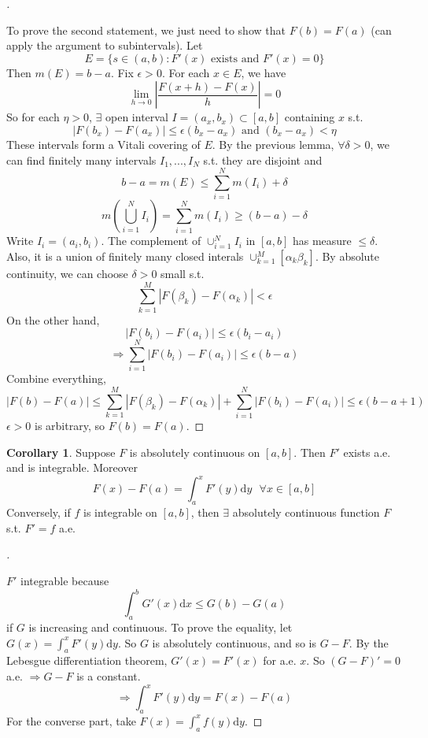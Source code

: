 \documentclass{article}
\theoremstyle{definition}
\newtheorem{cor}{Corollary}
\newenvironment{proofs}[1][\proofname]{%
  \begin{proof}[#1]$ $\par\nobreak\ignorespaces
}{%
  \end{proof}
}
\newcommand{\sfa}{\text{  } \forall}
\begin{document}
\begin{proofs}
  To prove the second statement, we just need to show that $F(b) = F(a)$ (can apply the argument to subintervals). Let 
  \[
    E = \{ s \in (a, b): F'(x) \text{ exists and } F'(x) = 0\}
  \]
  Then $m(E) = b - a$. Fix $\epsilon > 0$. For each $x \in E$, we have 
  \[
    \lim_{h \to 0} \left|\frac{F(x + h) - F(x)}{h}\right| = 0
  \]
  So for each $\eta > 0$, $\exists $ open interval $I = (a_x, b_x) \subset [a, b]$ containing $x$ s.t.
  \[
    |F(b_x) - F(a_x)| \leq \epsilon (b_x - a_x) \text{ and } (b_x - a_x) < \eta
  \]
  These intervals form a Vitali covering of $E$. By the previous lemma, $\forall \delta >0 $, we can find finitely many intervals $I_1, ..., I_N$ s.t. they are disjoint and 
  \[
    b - a = m(E) \leq \sum_{i = 1}^N m(I_i) + \delta
  \]
  \[
    m \left( \bigcup_{i = 1}^N I_i \right) = \sum_{i = 1}^N m(I_i) \geq (b - a) - \delta 
  \]
  Write $I_i = (a_i, b_i)$. The complement of $\cup_{i = 1}^N I_i$ in $[a, b]$ has measure $\leq \delta$. Also, it is a union of finitely many closed interals $\cup_{k = 1}^M [\alpha_k \beta_k]$. By absolute continuity, we can choose $\delta > 0$ small s.t.
  \[
    \sum_{k = 1}^M |F(\beta_k) - F(\alpha_k)| < \epsilon
  \]
  On the other hand, 
  \[
    |F(b_i) - F(a_i)| \leq \epsilon (b_i - a_i)
  \]
  \[
    \Rightarrow \sum_{i = 1}^N |F(b_i) - F(a_i)| \leq \epsilon (b - a)
  \]
  Combine everything, 
  \[
    |F(b) - F(a)| \leq \sum_{k = 1}^M |F(\beta_k) - F(\alpha_k)| + \sum_{i = 1}^N |F(b_i) - F(a_i)| \leq \epsilon(b - a + 1)
  \]
  $\epsilon > 0$ is arbitrary, so $F(b) = F(a)$. 

\end{proofs}

\begin{cor}
  Suppose $F$ is absolutely continuous on $[a, b]$. Then $F'$ exists a.e. and is integrable. Moreover 
  \[
    F(x) - F(a) = \int_a^x F'(y) \mathrm{d} y \sfa x \in [a, b]
  \]
  Conversely, if $f$ is integrable on $[a, b]$, then $\exists$ absolutely continuous function $F$ s.t. $F' = f$ a.e.
\end{cor}

\begin{proofs}
  $F'$ integrable because 
  \[
    \int_a^b G'(x) \mathrm{d} x \leq G(b) - G(a)
  \]
  if $G$ is increasing and continuous. To prove the equality, let $G(x) = \int_a^x F'(y) \mathrm{d} y$. So $G$ is absolutely continuous, and so is $G - F$.  By the Lebesgue differentiation theorem, $G'(x) = F'(x)$ for a.e. $x$. So $(G - F)' = 0$ a.e. $\Rightarrow G - F$ is a constant. 
  \[
    \Rightarrow \int_a^x F'(y) \mathrm{d} y = F(x) - F(a)
  \]
  For the converse part, take $F(x) = \int_a^x f(y) \mathrm{d} y$. 
\end{proofs}
\end{document}
